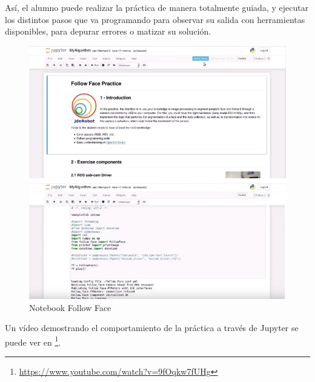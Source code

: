 Así, el alumno puede realizar la práctica de manera totalmente guiada, y ejecutar los distintos pasos que va programando para observar su salida con herramientas disponibles, para depurar errores o matizar su solución.

\begin{figure}[H]
  \begin{center}
    \includegraphics[width=0.98\linewidth]{figures/notebookff.jpg}
		\caption{Notebook Follow Face}
		\label{fig.notebook}
		\end{center}
\end{figure}

Un vídeo demostrando el comportamiento de la práctica a través de Jupyter se puede ver en \footnote{\url{https://www.youtube.com/watch?v=9fOqkw7fUHg}}.